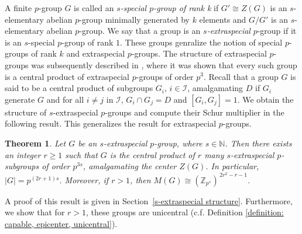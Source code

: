 \documentclass[preprint,sort&compress,12pt]{elsarticle}
\newtheorem{theorem}{Theorem}[section]
\numberwithin{equation}{section}
\theoremstyle{definition}
\begin{document}
A finite \(p\)-group \(G\) is called an
\emph{\(s\)-special \(p\)-group of rank k} if
$G' \cong Z(G)$ is an $s$-elementary abelian $p$-group minimally generated by $k$ elements
and \(G/G'\) is an \(s\)-elementary abelian \(p\)-group. We say that a group is an \emph{$s$-extraspecial} $p$-group if it is an $s$-special $p$-group of rank $1$. These groups genralize the notion of special $p$-groups of rank $k$ and extraspecial $p$-groups. The structure of extraspecial \(p\)-groups was subsequently described in
\cite[Theorem 3.3.4]{Karp1987}, where it was shown that every such group is a central product
of extraspecial \(p\)-groups of order \(p^{3}\). Recall that a group $G$ is said to be a central product of subgroups $G_i$, $i \in \mathcal{I}$, amalgamating $D$ if $G_i$ generate $G$ and for all $i \neq j$ in $\mathcal{I}$, $G_i \cap G_j =D$ and $[G_i,G_j]=1$. We obtain the structure of $s$-extraspecial $p$-groups and compute their Schur multiplier in the following result. This generalizes the result for extraspecial $p$-groups.
\begin{theorem}\label{Centralproductstructure}
Let \(G\) be an \(s\)-extraspecial \(p\)-group, where \(s \in \mathbb{N}\).
Then there exists an integer \(r \geq 1\) such that \(G\) is the central product
of \(r\) many \(s\)-extraspecial \(p\)-subgroups of order \(p^{3s}\), amalgamating
the center \(Z(G)\).
In particular,
$
|G| = p^{(2r+1)s}$.
Moreover, if \(r > 1\), then $M(G) \cong (\mathbb{Z}_{p^{s}})^{\,2r^{2}-r-1}$.

\end{theorem}
A proof of this result is given in Section~\ref{s-extraspecial structure}.
Furthermore, we show that for \(r>1\), these groups are unicentral (c.f. Definition \ref{definition: capable, epicenter, unicentral}).


\end{document}
